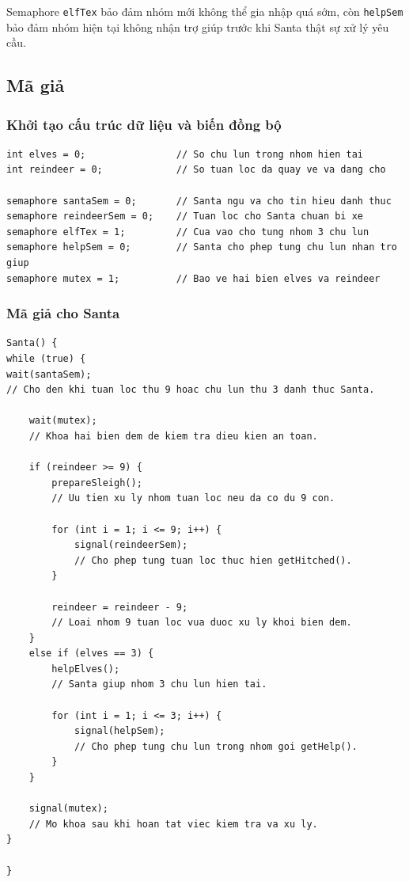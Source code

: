 Semaphore \texttt{elfTex} bảo đảm nhóm mới không thể gia nhập quá sớm,
còn \texttt{helpSem} bảo đảm nhóm hiện tại không nhận trợ giúp trước khi
Santa thật sự xử lý yêu cầu.

\subsection{Mã giả}

\subsubsection*{Khởi tạo cấu trúc dữ liệu và biến đồng bộ}

\begin{lstlisting}
int elves = 0;                // So chu lun trong nhom hien tai
int reindeer = 0;             // So tuan loc da quay ve va dang cho

semaphore santaSem = 0;       // Santa ngu va cho tin hieu danh thuc
semaphore reindeerSem = 0;    // Tuan loc cho Santa chuan bi xe
semaphore elfTex = 1;         // Cua vao cho tung nhom 3 chu lun
semaphore helpSem = 0;        // Santa cho phep tung chu lun nhan tro giup
semaphore mutex = 1;          // Bao ve hai bien elves va reindeer
\end{lstlisting}

\subsubsection*{Mã giả cho Santa}

\begin{lstlisting}
Santa() {
while (true) {
wait(santaSem);
// Cho den khi tuan loc thu 9 hoac chu lun thu 3 danh thuc Santa.

    wait(mutex);
    // Khoa hai bien dem de kiem tra dieu kien an toan.

    if (reindeer >= 9) {
        prepareSleigh();
        // Uu tien xu ly nhom tuan loc neu da co du 9 con.

        for (int i = 1; i <= 9; i++) {
            signal(reindeerSem);
            // Cho phep tung tuan loc thuc hien getHitched().
        }

        reindeer = reindeer - 9;
        // Loai nhom 9 tuan loc vua duoc xu ly khoi bien dem.
    }
    else if (elves == 3) {
        helpElves();
        // Santa giup nhom 3 chu lun hien tai.

        for (int i = 1; i <= 3; i++) {
            signal(helpSem);
            // Cho phep tung chu lun trong nhom goi getHelp().
        }
    }

    signal(mutex);
    // Mo khoa sau khi hoan tat viec kiem tra va xu ly.
}

}
\end{lstlisting}

